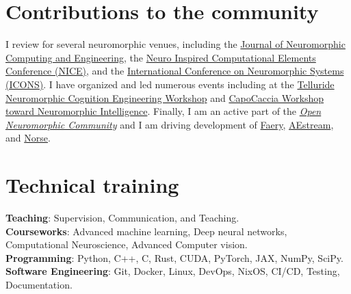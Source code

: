 \documentclass[11pt, a4paper]{article}
\newcommand{\years}[1]{\marginnote{\scriptsize #1}}
\begin{document}
\section*{Contributions to the community}
I review for several neuromorphic venues, including the \href{https://iopscience.iop.org/journal/2634-4386}{Journal of Neuromorphic Computing and Engineering}, the \href{https://niceworkshop.org/}{Neuro Inspired Computational Elements Conference (NICE)}, and the \href{https://iconsneuromorphic.cc/}{International Conference on Neuromorphic Systems (ICONS)}.
I have organized and led numerous events including at the \href{https://sites.google.com/view/telluride-2024/}{Telluride Neuromorphic Cognition Engineering Workshop} and \href{https://capocaccia.cc/en/}{CapoCaccia Workshop toward Neuromorphic Intelligence}.
Finally, I am an active part of the \emph{\href{https://open-neuromorphic.org/}{Open Neuromorphic Community}} and I am
driving development of \href{https://github.com/aestream/faery}{Faery}, \href{https://github.com/aestream}{AEstream}, and \href{https://github.com/norse/}{Norse}.
\vspace{-0.2cm}
\section*{Technical training}

\textbf{Teaching}: Supervision, Communication, and Teaching. \\
\textbf{Courseworks}: Advanced machine learning, Deep neural networks, Computational Neuroscience, Advanced Computer vision. \\
\textbf{Programming}: Python, C++, C, Rust, CUDA, PyTorch, JAX, NumPy, SciPy. \\
\textbf{Software Engineering}: Git, Docker, Linux, DevOps, NixOS, CI/CD, Testing, Documentation. \\
\end{document}
